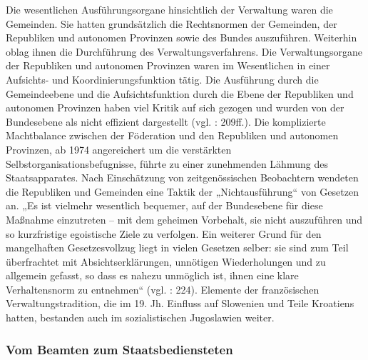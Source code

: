 Die wesentlichen Ausführungsorgane hinsichtlich der Verwaltung waren die Gemeinden. Sie hatten grundsätzlich die Rechtsnormen der Gemeinden, der Republiken und autonomen Provinzen sowie des Bundes auszuführen. Weiterhin oblag ihnen die Durchführung des Verwaltungsverfahrens. Die Verwaltungsorgane der Republiken und autonomen Provinzen waren im Wesentlichen in einer Aufsichts- und Koordinierungsfunktion tätig. Die Ausführung durch die Gemeindeebene und die Aufsichtsfunktion durch die Ebene der Republiken und autonomen Provinzen haben viel Kritik auf sich gezogen und wurden von der Bundesebene als nicht effizient dargestellt (vgl. \cite{beckm90}: 209ff.). Die komplizierte Machtbalance zwischen der Föderation und den Republiken und autonomen Provinzen, ab 1974 angereichert um die verstärkten Selbstorganisationsbefugnisse, führte zu einer zunehmenden Lähmung des Staatsapparates. Nach Einschätzung von zeitgenössischen Beobachtern wendeten die Republiken und Gemeinden eine Taktik der „Nichtausführung“ von Gesetzen an. „Es ist vielmehr wesentlich bequemer, auf der Bundesebene für diese Maßnahme einzutreten – mit dem geheimen Vorbehalt, sie nicht auszuführen und so kurzfristige egoistische Ziele zu verfolgen. Ein weiterer Grund für den mangelhaften Gesetzesvollzug liegt in vielen Gesetzen selber: sie sind zum Teil überfrachtet mit Absichtserklärungen, unnötigen Wiederholungen und zu allgemein gefasst, so dass es nahezu unmöglich ist, ihnen eine klare Verhaltensnorm zu entnehmen“ (vgl. \cite{beckm90}: 224). Elemente der französischen Verwaltungstradition, die im 19. Jh. Einfluss auf Slowenien und Teile Kroatiens hatten, bestanden auch im sozialistischen Jugoslawien weiter.

\subsubsection{Vom Beamten zum Staatsbediensteten}

